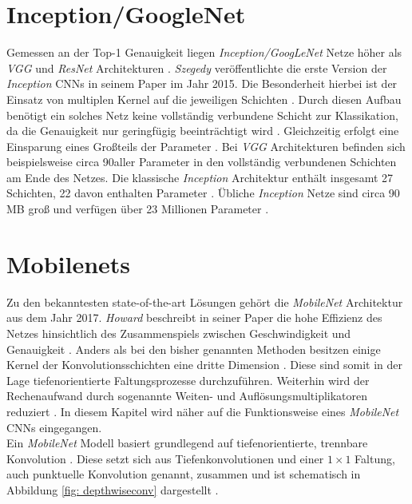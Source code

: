 		\section*{Inception/GoogleNet}
		\label{subsec: inception}
		Gemessen an der Top-1 Genauigkeit liegen \textit{Inception/GoogLeNet} Netze höher als \textit{VGG} und \textit{ResNet} Architekturen \cite{cnnvergleich}. \textit{Szegedy} veröffentlichte die erste Version der \textit{Inception} CNNs in seinem Paper \cite{inception} im Jahr 2015. Die Besonderheit hierbei ist der Einsatz von multiplen Kernel auf die jeweiligen Schichten \cite{inception}. Durch diesen Aufbau benötigt ein solches Netz keine vollständig verbundene Schicht zur Klassikation, da die Genauigkeit nur geringfügig beeinträchtigt wird \cite{inception}. Gleichzeitig erfolgt eine Einsparung eines Großteils der Parameter \cite{inception}. Bei \textit{VGG} Architekturen befinden sich beispielsweise circa 90\percent\text{ }aller Parameter in den vollständig verbundenen Schichten am Ende des Netzes. Die klassische \textit{Inception} Architektur enthält insgesamt 27 Schichten, 22 davon enthalten Parameter \cite{inception}. Übliche \textit{Inception} Netze sind circa 90 MB groß und verfügen über 23 Millionen Parameter \cite{keras}.\\ 
		

		
		\section*{Mobilenets}
		\label{subsec: mobilenets}
		Zu den bekanntesten state-of-the-art Lösungen gehört die \textit{MobileNet} Architektur aus dem Jahr 2017. \textit{Howard} beschreibt in seiner Paper die hohe Effizienz des Netzes hinsichtlich des Zusammenspiels zwischen Geschwindigkeit und Genauigkeit \cite{mobilenets}. Anders als bei den bisher genannten Methoden besitzen einige Kernel der Konvolutionsschichten eine dritte Dimension \cite{mobilenets}. Diese sind somit in der Lage tiefenorientierte Faltungsprozesse durchzuführen. Weiterhin wird der Rechenaufwand durch sogenannte Weiten- und Auflösungsmultiplikatoren reduziert \cite{mobilenets}. In diesem Kapitel wird näher auf die Funktionsweise eines \textit{MobileNet} CNNs eingegangen.\\
		
		Ein \textit{MobileNet} Modell basiert grundlegend auf tiefenorientierte, trennbare Konvolution \cite{mobilenets}. Diese setzt sich aus Tiefenkonvolutionen und einer $1\times1$ Faltung, auch punktuelle Konvolution genannt, zusammen und ist schematisch in Abbildung \ref{fig: depthwiseconv} dargestellt \cite{mobilenets}.\\
		
